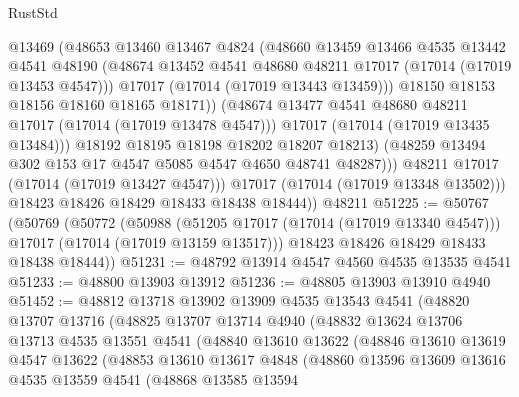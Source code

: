 \begin{lexlean}{RustStd}
\begin{coremodule}
                      @13469
                      (@48653
                        @13460
                        @13467
                        @4824
                        (@48660
                          @13459
                          @13466
                          @4535
                          @13442
                          @4541
                          @48190
                          (@48674 @13452 @4541 @48680 @48211 @17017 (@17014 (@17019 @13453 @4547)))
                          @17017
                          (@17014 (@17019 @13443 @13459)))
                        @18150
                        @18153
                        @18156
                        @18160
                        @18165
                        @18171))
                    (@48674 @13477 @4541 @48680 @48211 @17017 (@17014 (@17019 @13478 @4547)))
                    @17017
                    (@17014 (@17019 @13435 @13484)))
                  @18192
                  @18195
                  @18198
                  @18202
                  @18207
                  @18213)
                (@48259 @13494 @302 @153 @17 @4547 @5085 @4547 @4650 @48741 @48287)))
            @48211
            @17017
            (@17014 (@17019 @13427 @4547)))
          @17017
          (@17014 (@17019 @13348 @13502)))
        @18423
        @18426
        @18429
        @18433
        @18438
        @18444))
    @48211
@51225 := @50767
    (@50769
      (@50772
        (@50988
          (@51205 @17017 (@17014 (@17019 @13340 @4547)))
          @17017
          (@17014 (@17019 @13159 @13517)))
        @18423
        @18426
        @18429
        @18433
        @18438
        @18444))
@51231 := @48792 @13914 @4547 @4560 @4535 @13535 @4541
@51233 := @48800 @13903 @13912
@51236 := @48805 @13903 @13910 @4940
@51452 := @48812
    @13718
    @13902
    @13909
    @4535
    @13543
    @4541
    (@48820
      @13707
      @13716
      (@48825
        @13707
        @13714
        @4940
        (@48832
          @13624
          @13706
          @13713
          @4535
          @13551
          @4541
          (@48840
            @13610
            @13622
            (@48846
              @13610
              @13619
              @4547
              @13622
              (@48853
                @13610
                @13617
                @4848
                (@48860
                  @13596
                  @13609
                  @13616
                  @4535
                  @13559
                  @4541
                  (@48868
                    @13585
                    @13594

\end{coremodule}
\end{lexlean}

